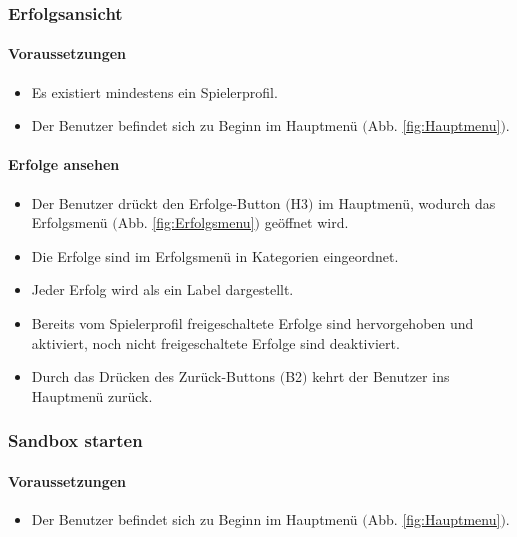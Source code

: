 \subsubsection{Erfolgsansicht}
\paragraph{Voraussetzungen}
\begin{itemize}
	\item Es existiert mindestens ein Spielerprofil.
	\item Der Benutzer befindet sich zu Beginn im Hauptmenü $($Abb. \ref{fig:Hauptmenu}$)$.
\end{itemize}
\paragraph{Erfolge ansehen}
\begin{itemize}
	\item Der Benutzer drückt den Erfolge-Button $($H3$)$ im Hauptmenü, wodurch das Erfolgsmenü $($Abb. \ref{fig:Erfolgsmenu}$)$ geöffnet wird.
	\item Die Erfolge sind im Erfolgsmenü in Kategorien eingeordnet.
	\item Jeder Erfolg wird als ein Label dargestellt.
	\item Bereits vom Spielerprofil freigeschaltete Erfolge sind hervorgehoben und aktiviert, noch nicht freigeschaltete Erfolge sind deaktiviert.
	\item Durch das Drücken des Zurück-Buttons $($B2$)$ kehrt der Benutzer ins Hauptmenü zurück.
\end{itemize}

\subsubsection{Sandbox starten}
\paragraph{Voraussetzungen}
\begin{itemize}
	\item Der Benutzer befindet sich zu Beginn im Hauptmenü $($Abb. \ref{fig:Hauptmenu}$)$.
\end{itemize}
